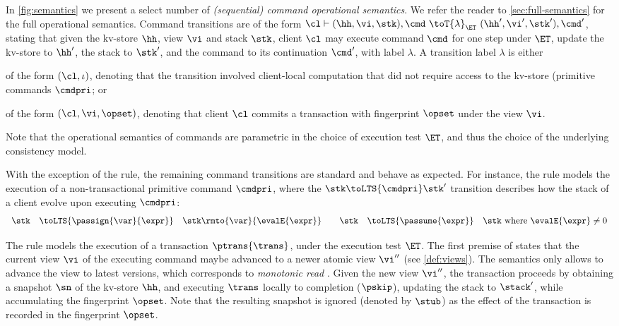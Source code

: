 In \cref{fig:semantics} we present a select number of \emph{(sequential) command operational semantics}.
We refer the reader to \cref{sec:full-semantics} for the full operational semantics.
Command transitions are of the form $\cl \vdash (\hh, \vi, \stk), \cmd \ \toT{\lambda}_{\ET} \ (\hh', \vi', \stk') , \cmd'$, 
stating that given the kv-store $\hh$, view $\vi$ and stack $\stk$, client $\cl$ may execute command $\cmd$ for one step under $\ET$, update the kv-store to $\hh'$, the stack to $\stk'$, and the command to its continuation $\cmd'$, with label $\lambda$.
A transition label $\lambda$ is either
\begin{enumerate*}
	\item of the form $(\cl, \iota)$, denoting that the transition involved 
client-local computation that did not require access to the kv-store (\eg primitive commands $\cmdpri$; or
	\item of the form $(\cl, \vi, \opset)$, denoting that client $\cl$ commits a transaction with fingerprint $\opset$ under the view $\vi$.
\end{enumerate*}
Note that the operational semantics of commands are parametric in the choice of execution test $\ET$, 
and thus the choice of the underlying consistency model.


With the exception of the  rule, the remaining command transitions are standard and behave as expected. 
For instance, the  rule models the execution of a non-transactional primitive command $\cmdpri$, where the $\stk \toLTS{\cmdpri} \stk'$ transition describes how the stack of a client 
evolve upon executing $\cmdpri$:
\[
\begin{array}{rcl @{\qquad} rcl}
\stk  & \toLTS{\passign{\var}{\expr}} & \stk\rmto{\var}{\evalE{\expr}} &
\stk  & \toLTS{\passume{\expr}} & \stk \text{ where } \evalE{\expr} \neq 0 \\
\end{array}                                                                                               
\]

The  rule models the execution of a transaction $\ptrans{\trans}$, under the execution test $\ET$. 
The first premise of  states that the current view $\vi$ of the executing command maybe advanced to a newer atomic view $\vi''$ (see \cref{def:views}). 
The semantics only allows to advance the view to latest versions, which corresponds to \emph{monotonic read} \cite{.......}.
Given the new view $\vi''$, the transaction proceeds by obtaining a snapshot $\sn$ of the kv-store $\hh$, and executing $\trans$ locally to completion ($\pskip$), updating the stack to $\stack'$, while accumulating the fingerprint $\opset$. Note that the resulting snapshot is ignored (denoted by $\stub$) as the effect of the transaction is recorded in the fingerprint $\opset$. 
%

